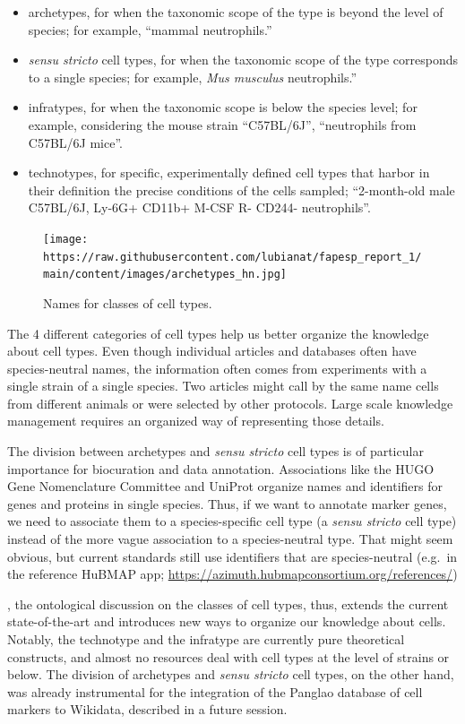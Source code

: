 \begin{itemize}
\tightlist
\item
  archetypes, for when the taxonomic scope of the type is beyond the level of species; for example, ``mammal neutrophils.''
\item
  \emph{sensu stricto} cell types, for when the taxonomic scope of the type corresponds to a single species; for example, \emph{Mus musculus} neutrophils.''
\item
  infratypes, for when the taxonomic scope is below the species level; for example, considering the mouse strain ``C57BL/6J'', ``neutrophils from C57BL/6J mice''.
\item
  technotypes, for specific, experimentally defined cell types that harbor in their definition the precise conditions of the cells sampled; ``2-month-old male C57BL/6J, Ly-6G+ CD11b+ M-CSF R- CD244- neutrophils''.
\end{itemize}

\begin{figure}
\hypertarget{fig:classes}{%
\centering
\texttt{[image: https://raw.githubusercontent.com/lubianat/fapesp\_report\_1/main/content/images/archetypes\_hn.jpg]}
\caption{Names for classes of cell types.}\label{fig:classes}
}
\end{figure}

The 4 different categories of cell types help us better organize the knowledge about cell types.
Even though individual articles and databases often have species-neutral names, the information often comes from experiments with a single strain of a single species.
Two articles might call by the same name cells from different animals or were selected by other protocols.
Large scale knowledge management requires an organized way of representing those details.

The division between archetypes and \emph{sensu stricto} cell types is of particular importance for biocuration and data annotation.
Associations like the HUGO Gene Nomenclature Committee and UniProt organize names and identifiers for genes and proteins in single species.
Thus, if we want to annotate marker genes, we need to associate them to a species-specific cell type (a \emph{sensu stricto} cell type) instead of the more vague association to a species-neutral type.
That might seem obvious, but current standards still use identifiers that are species-neutral (e.g.~in the reference HuBMAP app; \url{https://azimuth.hubmapconsortium.org/references/})

, the ontological discussion on the classes of cell types, thus, extends the current state-of-the-art and introduces new ways to organize our knowledge about cells.
Notably, the technotype and the infratype are currently pure theoretical constructs, and almost no resources deal with cell types at the level of strains or below.
The division of archetypes and \emph{sensu stricto} cell types, on the other hand, was already instrumental for the integration of the Panglao database of cell markers to Wikidata, described in a future session.


